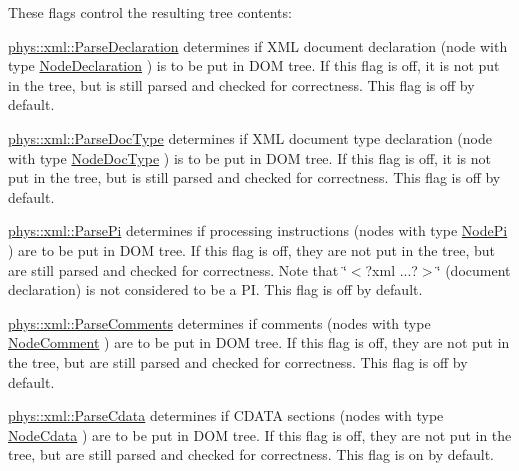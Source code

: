 These flags control the resulting tree contents:
\begin{DoxyItemize}
\item \hyperlink{namespacephys_1_1xml_a463f15fc43d69ab835c8598826f65646}{phys::xml::ParseDeclaration} determines if XML document declaration (node with type \hyperlink{namespacephys_1_1xml_a668b0cc666a9d49f7c7222a7552115d3}{NodeDeclaration} ) is to be put in DOM tree. If this flag is off, it is not put in the tree, but is still parsed and checked for correctness. This flag is off by default.
\item \hyperlink{namespacephys_1_1xml_adf5ee79dc4c200ad85b64a8308b0c805}{phys::xml::ParseDocType} determines if XML document type declaration (node with type \hyperlink{namespacephys_1_1xml_a668b0cc666a9d49f7c7222a7552115d3}{NodeDocType} ) is to be put in DOM tree. If this flag is off, it is not put in the tree, but is still parsed and checked for correctness. This flag is off by default.
\item \hyperlink{namespacephys_1_1xml_a4d324954fc33d50155bae04587da13e2}{phys::xml::ParsePi} determines if processing instructions (nodes with type \hyperlink{namespacephys_1_1xml_a668b0cc666a9d49f7c7222a7552115d3}{NodePi} ) are to be put in DOM tree. If this flag is off, they are not put in the tree, but are still parsed and checked for correctness. Note that \char`\"{}$<$?xml ...?$>$\char`\"{} (document declaration) is not considered to be a PI. This flag is off by default.
\item \hyperlink{namespacephys_1_1xml_a83ba30a7bee5a0fd4aa2f6136c8793fc}{phys::xml::ParseComments} determines if comments (nodes with type \hyperlink{namespacephys_1_1xml_a668b0cc666a9d49f7c7222a7552115d3}{NodeComment} ) are to be put in DOM tree. If this flag is off, they are not put in the tree, but are still parsed and checked for correctness. This flag is off by default.
\item \hyperlink{namespacephys_1_1xml_aec00a2a16700dfd76f8f3c776bd000ac}{phys::xml::ParseCdata} determines if CDATA sections (nodes with type \hyperlink{namespacephys_1_1xml_a668b0cc666a9d49f7c7222a7552115d3}{NodeCdata} ) are to be put in DOM tree. If this flag is off, they are not put in the tree, but are still parsed and checked for correctness. This flag is on by default.

\end{DoxyItemize}

